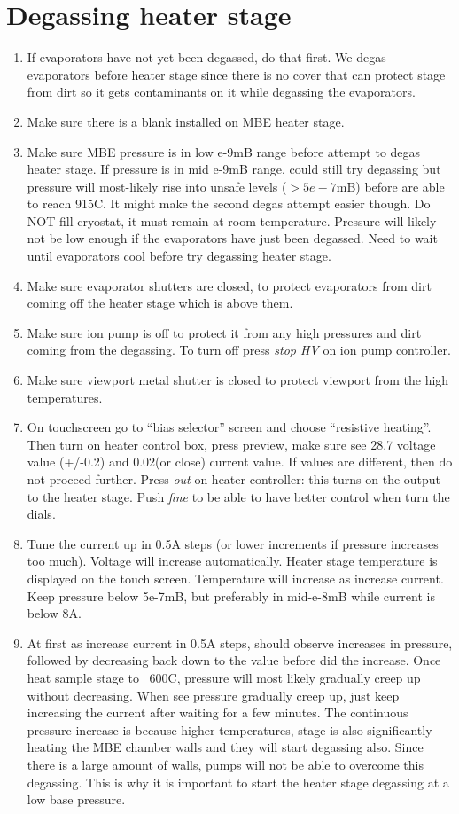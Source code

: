 \section{Degassing heater stage}
\begin{enumerate}
\item	If evaporators have not yet been degassed, do that first. We degas evaporators before heater stage since there is no cover that can protect stage from dirt so it gets contaminants on it while degassing the evaporators.
\item	Make sure there is a blank installed on MBE heater stage. 
\item	Make sure MBE pressure is in low e-9mB range before attempt to degas heater stage. If pressure is in mid e-9mB range, could still try degassing but pressure will most-likely rise into unsafe levels ($>5e-7$mB) before are able to reach 915C. It might make the second degas attempt easier though. Do NOT fill cryostat, it must remain at room temperature. Pressure will likely not be low enough if the evaporators have just been degassed. Need to wait until evaporators cool before try degassing heater stage. 
\item	Make sure evaporator shutters are closed, to protect evaporators from dirt coming off the heater stage which is above them.
\item	Make sure ion pump is off to protect it from any high pressures and dirt coming from the degassing. To turn off press \emph{stop HV} on ion pump controller.
\item	Make sure viewport metal shutter is closed to protect viewport from the high temperatures.
\item	On touchscreen go to “bias selector” screen and choose “resistive heating”. Then turn on heater control box, press preview, make sure see 28.7 voltage value (+/-0.2) and 0.02(or close) current value. If values are different, then do not proceed further. Press \emph{out} on heater controller: this turns on the output to the heater stage. Push \emph{fine} to be able to have better control when turn the dials. 
\item	Tune the current up in 0.5A steps (or lower increments if pressure increases too much).  Voltage will increase automatically. Heater stage temperature is displayed on the touch screen. Temperature will increase as increase current. Keep pressure below 5e-7mB, but preferably in mid-e-8mB while current is below 8A.
\item	At first as increase current in 0.5A steps, should observe increases in pressure, followed by decreasing back down to the value before did the increase. Once heat sample stage to ~600C, pressure will most likely gradually creep up without decreasing. When see pressure gradually creep up, just keep increasing the current after waiting for a few minutes. The continuous pressure increase is because higher temperatures, stage is also significantly heating the MBE chamber walls and they will start degassing also. Since there is a large amount of walls, pumps will not be able to overcome this degassing. This is why it is important to start the heater stage degassing at a low base pressure.

\end{enumerate}
